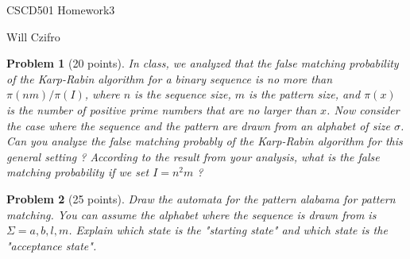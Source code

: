 \documentclass[11pt]{article}
\newtheorem{problem}{Problem}
\begin{document}
\begin{center}
  {\LARGE CSCD501 Homework3}

\bigskip 

{\Large Will Czifro}

\end{center}

\bigskip 

\begin{problem}[20 points]
\label{prob:1}
 In class, we analyzed that the false matching probability of the Karp-Rabin algorithm for
a binary sequence is no more than $\pi(nm)/\pi(I)$, where $n$ is the sequence size, $m$ is the pattern size, and $\pi(x)$ is
the number of positive prime numbers that are no larger than $x$. Now consider the case where the sequence and
the pattern are drawn from an alphabet of size $\sigma$. Can you analyze the false matching probably of the Karp-Rabin
algorithm for this general setting ? According to the result from your analysis, what is the false matching probability
if we set $I = n^2m$ ?
\end{problem}



\begin{problem}[25 points]
\label{prob:2}
 Draw the automata for the pattern alabama for pattern matching. You can assume the
alphabet where the sequence is drawn from is $\Sigma = {a, b, l, m}$. Explain which state is the "starting state" and which
state is the "acceptance state".
\end{problem}



\end{document}
